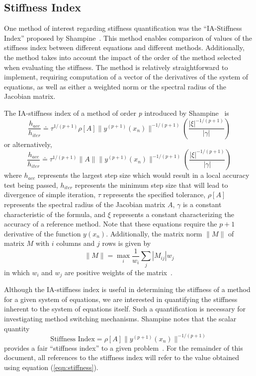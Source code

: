\documentclass[12pt]{ussci}
\begin{document}
\subsection{Stiffness Index}

One method of interest regarding stiffness quantification was the ``IA-Stiffness Index'' proposed by Shampine~\cite{Shampine1982}.
This method enables comparison of values of the stiffness index between different equations and different methods.
Additionally, the method takes into account the impact of the order of the method selected when evaluating the stiffness.
The method is relatively straightforward to implement, requiring computation of a vector of the derivatives of the system of equations, as well as either a weighted norm or the spectral radius of the Jacobian matrix.

The IA-stiffness index of a method of order \textit{p} introduced by Shampine~\cite{Shampine1982} is
\begin{equation}
    \frac{h_{acc}}{h_{iter}} \doteq \tau ^ {1/(p + 1)} \rho [A] \|y^{(p+1)}(x_n)\|^{-1/(p+1)} \left( \frac{|\xi|^{-1/(p+1)}}{|\gamma|} \right)
\end{equation}
or alternatively,
\begin{equation}
    \frac{h_{acc}}{h_{iter}} \doteq \tau ^ {1/(p + 1)} \|A\|\|y^{(p+1)}(x_n)\|^{-1/(p+1)} \left( \frac{|\xi|^{-1/(p+1)}}{|\gamma|} \right)
\end{equation}
where $h_{acc}$ represents the largest step size which would result in a local accuracy test being passed, $h_{iter}$ represents the minimum step size that will lead to divergence of simple iteration, $\tau$ represents the specified tolerance, $\rho [A]$ represents the spectral radius of the Jacobian matrix $A$, $\gamma$ is a constant characteristic of the formula, and $\xi$ represents a constant characterizing the accuracy of a reference method.
Note that these equations require the $p+1$ derivative of the function $y(x_n)$.
Additionally, the matrix norm $\|M\|$ of matrix $M$ with $i$ columns and $j$ rows is given by
\begin{equation}
    \|M\| = \max_{i} \frac{1}{w_i} \sum_{j} |M_{ij}|w_j
\end{equation}
in which \(w_i\) and \(w_j\) are positive weights of the matrix~\cite{Shampine1985}.

Although the IA-stiffness index is useful in determining the stiffness of a method for a given system of equations, we are interested in quantifying the stiffness inherent to the system of equations itself.
Such a quantification is necessary for investigating method switching mechanisms.
Shampine notes that the scalar quantity
\begin{equation}\label{eqn:stiffness}
    \textrm{Stiffness Index} = \rho [A] \|y^{(p+1)}(x_n)\|^{-1/(p+1)}
\end{equation}
provides a fair ``stiffness index'' to a given problem~\cite{Shampine1985}. For the remainder of this document, all references to the stiffness index will refer to the value obtained using equation (\ref{eqn:stiffness}).
\end{document}
